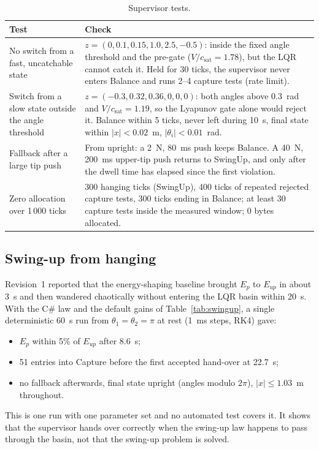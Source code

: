 \documentclass[11pt,a4paper]{article}
\newcommand{\csat}{c_{\mathrm{sat}}}
\begin{document}
\begin{table}[h]
\centering
\begin{tabularx}{\linewidth}{@{}>{\raggedright\arraybackslash}p{3.6cm} X@{}}
\toprule
Test & Check \\
\midrule
No switch from a fast, uncatchable state &
$z = (0, 0.1, 0.15, 1.0, 2.5, -0.5)$: inside the fixed angle threshold and the pre-gate
($V/\csat = 1.78$), but the LQR cannot catch it. Held for 30 ticks, the supervisor never enters
Balance and runs 2--4 capture tests (rate limit). \\
Switch from a slow state outside the angle threshold &
$z = (-0.3, 0.32, 0.36, 0, 0, 0)$: both angles above 0.3~rad and $V/\csat = 1.19$, so the
Lyapunov gate alone would reject it. Balance within 5 ticks, never left during 10~s, final
state within $|x| < 0.02$~m, $|\theta_i| < 0.01$~rad. \\
Fallback after a large tip push &
From upright: a 2~N, 80~ms push keeps Balance. A 40~N, 200~ms upper-tip push returns to SwingUp,
and only after the dwell time has elapsed since the first violation. \\
Zero allocation over 1\,000 ticks &
300 hanging ticks (SwingUp), 400 ticks of repeated rejected capture tests, 300 ticks ending in
Balance; at least 30 capture tests inside the measured window; 0 bytes allocated. \\
\bottomrule
\end{tabularx}
\caption{Supervisor tests.}
\label{tab:tests}
\end{table}

\subsection{Swing-up from hanging}
Revision~1 reported that the energy-shaping baseline brought $E_p$ to $E_{up}$ in about 3~s and
then wandered chaotically without entering the LQR basin within 20~s. With the C\# law and the
default gains of Table~\ref{tab:swingup}, a single deterministic 60~s run from
$\theta_1 = \theta_2 = \pi$ at rest (1~ms steps, RK4) gave:
\begin{itemize}
\item $E_p$ within 5\% of $E_{up}$ after 8.6~s;
\item 51 entries into Capture before the first accepted hand-over at 22.7~s;
\item no fallback afterwards, final state upright (angles modulo $2\pi$), $|x| \le 1.03$~m
throughout.
\end{itemize}
This is one run with one parameter set and no automated test covers it. It shows that the
supervisor hands over correctly when the swing-up law happens to pass through the basin, not
that the swing-up problem is solved.
\end{document}
